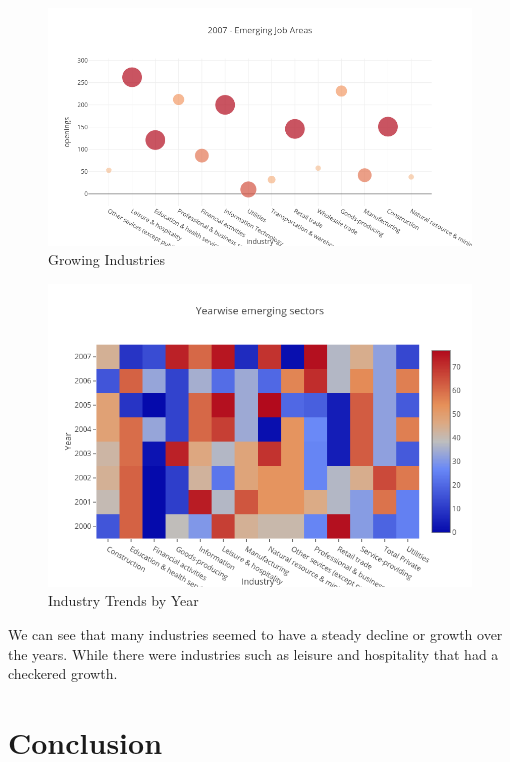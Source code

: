 \documentclass[11pt,letterpaper]{article}
\begin{document}
\begin{figure}[h]
	\includegraphics[width=\linewidth]{"./pictures/emerging_jobs"}
	\caption{Growing Industries}
	\label{fig:Job Growth}
\end{figure}

\begin{figure}[h]
	\includegraphics[width=\linewidth]{"./pictures/yearwise emerging sectors"}
	\caption{Industry Trends by Year}
	\label{fig:Yearly Growth}
\end{figure}

We can see that many industries seemed to have a steady decline or growth over the years. While there were industries such as leisure and hospitality that had a checkered growth.  

\section{Conclusion}
\end{document}
